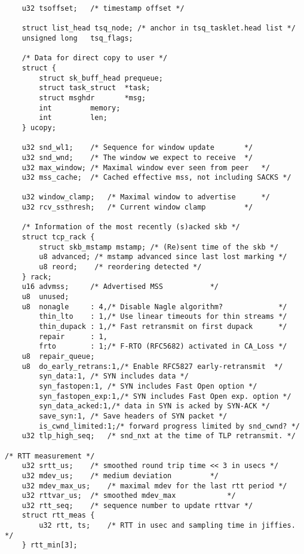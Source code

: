 \begin{verbatim}
    u32 tsoffset;   /* timestamp offset */

    struct list_head tsq_node; /* anchor in tsq_tasklet.head list */
    unsigned long   tsq_flags;

    /* Data for direct copy to user */
    struct {
        struct sk_buff_head prequeue;
        struct task_struct  *task;
        struct msghdr       *msg;
        int         memory;
        int         len;
    } ucopy;

    u32 snd_wl1;    /* Sequence for window update       */
    u32 snd_wnd;    /* The window we expect to receive  */
    u32 max_window; /* Maximal window ever seen from peer   */
    u32 mss_cache;  /* Cached effective mss, not including SACKS */

    u32 window_clamp;   /* Maximal window to advertise      */
    u32 rcv_ssthresh;   /* Current window clamp         */

    /* Information of the most recently (s)acked skb */
    struct tcp_rack {
        struct skb_mstamp mstamp; /* (Re)sent time of the skb */
        u8 advanced; /* mstamp advanced since last lost marking */
        u8 reord;    /* reordering detected */
    } rack;
    u16 advmss;     /* Advertised MSS           */
    u8  unused;
    u8  nonagle     : 4,/* Disable Nagle algorithm?             */
        thin_lto    : 1,/* Use linear timeouts for thin streams */
        thin_dupack : 1,/* Fast retransmit on first dupack      */
        repair      : 1,
        frto        : 1;/* F-RTO (RFC5682) activated in CA_Loss */
    u8  repair_queue;
    u8  do_early_retrans:1,/* Enable RFC5827 early-retransmit  */
        syn_data:1, /* SYN includes data */
        syn_fastopen:1, /* SYN includes Fast Open option */
        syn_fastopen_exp:1,/* SYN includes Fast Open exp. option */
        syn_data_acked:1,/* data in SYN is acked by SYN-ACK */
        save_syn:1, /* Save headers of SYN packet */
        is_cwnd_limited:1;/* forward progress limited by snd_cwnd? */
    u32 tlp_high_seq;   /* snd_nxt at the time of TLP retransmit. */

/* RTT measurement */
    u32 srtt_us;    /* smoothed round trip time << 3 in usecs */
    u32 mdev_us;    /* medium deviation         */
    u32 mdev_max_us;    /* maximal mdev for the last rtt period */
    u32 rttvar_us;  /* smoothed mdev_max            */
    u32 rtt_seq;    /* sequence number to update rttvar */
    struct rtt_meas {
        u32 rtt, ts;    /* RTT in usec and sampling time in jiffies. */
    } rtt_min[3];


\end{verbatim}
